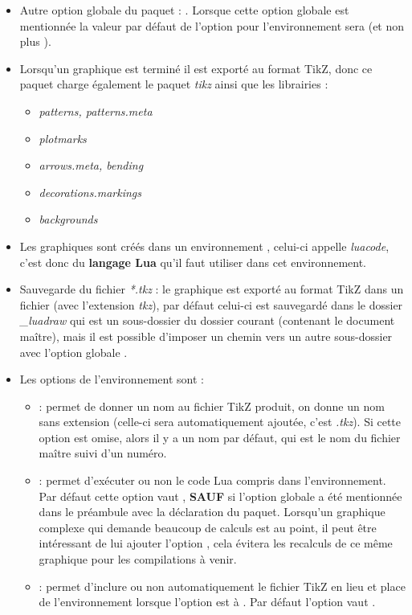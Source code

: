 \begin{itemize}
    \item Autre option globale du paquet : . Lorsque cette option globale est mentionnée la valeur par défaut de l'option  pour l'environnement \luadrawenv sera \false (et non plus \true).

    \item Lorsqu'un graphique est terminé il est exporté au format TikZ, donc ce paquet charge également le paquet \emph{tikz} ainsi que les librairies :
    \begin{itemize}
    \item\emph{patterns, patterns.meta}
    \item\emph{plotmarks}
    \item\emph{arrows.meta, bending}
    \item\emph{decorations.markings}
    \item\emph{backgrounds}
    \end{itemize}
        
    \item Les graphiques sont créés dans un environnement \luadrawenv, celui-ci appelle \emph{luacode}, c'est donc du \textbf{langage Lua} qu'il faut utiliser dans cet environnement.

    \item Sauvegarde du fichier \emph{*.tkz} : le graphique est exporté au format TikZ dans un fichier (avec l'extension \emph{tkz}), par défaut celui-ci est sauvegardé dans le dossier \emph{\_luadraw} qui est un sous-dossier du dossier courant (contenant le document maître), mais il est possible d'imposer un chemin vers un autre sous-dossier avec l'option globale .
    
    \item Les options de l'environnement sont :
    \begin{itemize}
    \item {} : permet de donner un nom au fichier TikZ produit, on donne un nom sans extension (celle-ci sera automatiquement ajoutée, c'est \emph{.tkz}). Si cette option est omise, alors il y a un nom par défaut, qui est le nom du fichier maître suivi d'un numéro.
    
    \item {} : permet d'exécuter ou non le code Lua compris dans l'environnement. Par défaut cette option vaut \true, \textbf{SAUF} si l'option globale  a été mentionnée dans le préambule avec la déclaration du paquet. Lorsqu'un graphique complexe qui demande beaucoup de calculs est au point, il peut être intéressant de lui ajouter l'option , cela évitera les recalculs de ce même graphique pour les compilations à venir.
    
    \item {} : permet d'inclure ou non automatiquement le fichier TikZ en lieu et place de l'environnement \luadrawenv lorsque l'option  est à \false. Par défaut l'option  vaut \true.
    \end{itemize}
\end{itemize}


